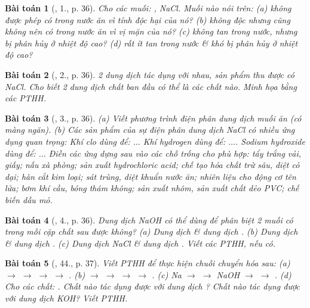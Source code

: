 \documentclass{article}
\newtheorem{baitoan}{Bài toán}
\begin{document}
\begin{baitoan}[\cite{SGK_Hoa_Hoc_9}, 1., p. 36]
	Cho các muối: \emph{, NaCl}. Muối nào nói trên: (a) không được phép có trong nước ăn vì tính độc hại của nó? (b) không độc nhưng cũng không nên có trong nước ăn vì vị mặn của nó? (c) không tan trong nước, nhưng bị phân hủy ở nhiệt độ cao? (d) rất ít tan trong nước \& khó bị phân hủy ở nhiệt độ cao?
\end{baitoan}

\begin{baitoan}[\cite{SGK_Hoa_Hoc_9}, 2., p. 36]
	2 dung dịch tác dụng với nhau, sản phẩm thu được có \emph{NaCl}. Cho biết 2 dung dịch chất ban đầu có thể là các chất nào. Minh họa bằng các PTHH.
\end{baitoan}

\begin{baitoan}[\cite{SGK_Hoa_Hoc_9}, 3., p. 36]
	(a) Viết phương trình điện phân dung dịch muối ăn (có màng ngăn). (b) Các sản phẩm của sự điện phân dung dịch \emph{NaCl} có nhiều ứng dụng quan trọng: Khí clo dùng để: $\ldots$ Khí hydrogen dùng để: $\ldots$. Sodium hydroxide dùng để: $\ldots$ Điền các ứng dựng sau vào các chỗ trống cho phù hợp: tẩy trắng vải, giấy; nấu xà phòng; sản xuất hydrochloric acid; chế tạo hóa chất trừ sâu, diệt cỏ dại; hàn cắt kim loại; sát trùng, diệt khuẩn nước ăn; nhiên liệu cho động cơ tên lửa; bơm khí cầu, bóng thám không; sản xuất nhôm, sản xuất chất dẻo PVC; chế biến dầu mỏ.
\end{baitoan}

\begin{baitoan}[\cite{SGK_Hoa_Hoc_9}, 4., p. 36]
	Dung dịch \emph{NaOH} có thể dùng để phân biệt 2 muối có trong mỗi cặp chất sau được không? (a) Dung dịch \emph{} \& dung dịch \emph{}. (b) Dung dịch \emph{} \& dung dịch \emph{}. (c) Dung dịch \emph{NaCl} \& dung dịch \emph{}. Viết các PTHH, nếu có.
\end{baitoan}

\begin{baitoan}[\cite{An_350_BT_Hoa_Hoc_9}, 44., p. 37]
	Viết PTHH để thực hiện chuỗi chuyển hóa sau: (a) \emph{ $\to$  $\to$  $\to$  $\to$ }. (b) \emph{ $\to$  $\to$  $\to$  $\to$ }. (c) \emph{Na $\to$  $\to$ NaOH $\to$  $\to$ }. (d) Cho các chất: \emph{}. Chất nào tác dụng được với dung dịch \emph{}? Chất nào tác dụng được với dung dịch \emph{KOH}? Viết PTHH.
\end{baitoan}
\end{document}
